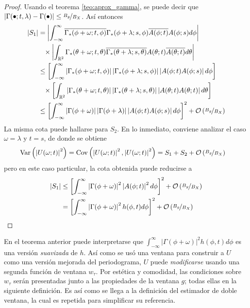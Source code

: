\documentclass[12pt,letterpaper]{book}
\newcommand{\R}{\mathbb{R}}
\newcommand{\intR}{\int_{-\infty}^{\infty}}
\newcommand{\Var}[1]{\mathrm{Var}\left( #1 \right)}
\newcommand{\Cov}[1]{\mathrm{Cov}\left( #1 \right)}
\newcommand{\abso}[1]{\left| #1 \right|}
\newcommand{\orden}[1]{\mathcal{O}\left( #1 \right)}
\newcommand{\pheq}{\phantom{=}}
\begin{document}
\begin{proof}
Usando el teorema \ref{teo:aprox_gamma}, se puede decir que $\abso{\Gamma(\bullet; t, \lambda) - \Gamma(\bullet)} \leq \nicefrac{B_g}{B_X}$. Así entonces
\begin{align*}
\abso{S_1} &=
 \abso{ \intR \overline{\Gamma_*(\phi + \omega; t, \phi)} \Gamma_*(\phi+ \lambda; s, \phi)
 \overline{A(\phi; t)} A(\phi; s) d\phi } \\
 &\pheq \times \abso{ \int_{\R^{2}} \Gamma_*(\theta+ \omega; t, \theta) 
  \overline{\Gamma_*(\theta + \lambda; s, \theta)}  
 A(\theta; t)   \overline{A(\theta; t)} d\theta } \\ 
 &\leq
 \left[ \intR \abso{\Gamma_*(\phi + \omega; t, \phi)} \abso{\Gamma_*(\phi+ \lambda; s, \phi)}
 \abso{A(\phi; t) A(\phi; s)} d\phi \right] \\
 &\pheq \times \left[ \int_{\R^{2}} \abso{\Gamma_*(\theta+ \omega; t, \theta)} 
  \abso{\Gamma_*(\theta + \lambda; s, \theta)}  
 \abso{A(\theta; t) A(\theta; t)} d\theta \right] \\ 
 &\leq
 \left[ \intR \abso{\Gamma(\phi + \omega)} \abso{\Gamma(\phi+ \lambda)}
 \abso{A(\phi; t) A(\phi; s)} d\phi \right]^{2} + \orden{\nicefrac{B_g}{B_X}}
\end{align*}
La misma cota puede hallarse para $S_2$. En lo inmediato, conviene analizar el caso $\omega = \lambda$ y $t = s$, de donde se obtiene
\begin{align*}
\Var{\abso{U(\omega; t)}^{2}} &= \Cov{\abso{U(\omega; t)}^{2}, \abso{U(\omega; t)}^{2}} = S_1 + S_2 + \orden{\nicefrac{B_g}{B_X}}
\end{align*}
pero en este caso particular, la cota obtenida puede reducirse a
\begin{align*}
\abso{S_1} & \leq
\left[ \intR \abso{\Gamma(\phi + \omega)}^{2} \abso{A(\phi; t)}^{2} d\phi \right]^{2} + \orden{\nicefrac{B_g}{B_X}} \\
&= 
\left[ \intR \abso{\Gamma(\phi + \omega)}^{2} h(\phi, t) d\phi \right]^{2} + \orden{\nicefrac{B_g}{B_X}}
\end{align*}
\end{proof}

En el teorema anterior puede interpretarse que $\intR \abso{\Gamma(\phi + \omega)}^{2} h(\phi, t) d\phi$ es una versión \textit{suavizada} de $h$.
%
Así como se usó una ventana para construir a $U$ como una versión mejorada del periodograma, $U$ puede \textit{modificarse} usando una segunda función de ventana $w_\tau$. 
%
Por estética y comodidad, las condiciones sobre $w_\tau$ serán presentadas junto a las propiedades de la ventana $g$; todas ellas en la siguiente definición.
%
Es así como se llega a la definición del estimador de doble ventana, la cual es repetida para simplificar su referencia.
\end{document}
